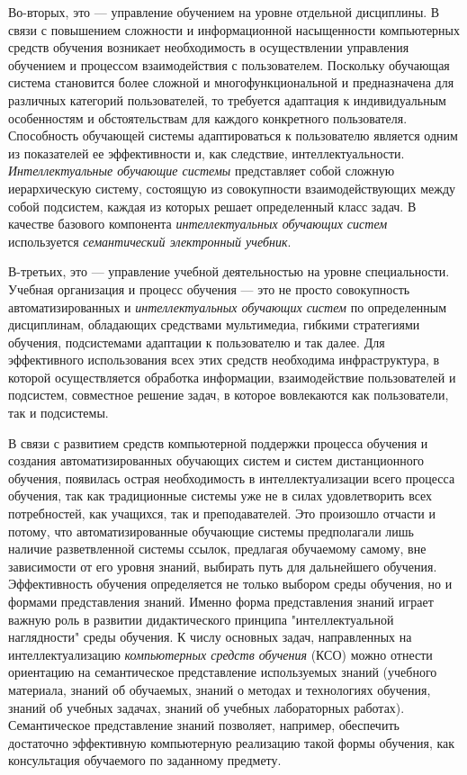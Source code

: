 Во-вторых, это --- управление обучением на уровне отдельной дисциплины. В связи с повышением сложности и информационной насыщенности компьютерных средств обучения возникает необходимость в осуществлении управления обучением и процессом взаимодействия с пользователем. Поскольку обучающая система становится более сложной и многофункциональной и предназначена для различных категорий пользователей, то требуется адаптация к индивидуальным особенностям и обстоятельствам для каждого конкретного пользователя. Способность обучающей системы адаптироваться к пользователю является одним из показателей ее эффективности и, как следствие, интеллектуальности. \textit{Интеллектуальные обучающие системы} представляет собой сложную иерархическую систему, состоящую из совокупности взаимодействующих между собой подсистем, каждая из которых решает определенный класс задач. В качестве базового компонента \textit{интеллектуальных обучающих систем} используется \textit{семантический электронный учебник}.

В-третьих, это --- управление учебной деятельностью на уровне специальности. Учебная организация и процесс обучения --- это не просто совокупность автоматизированных и \textit{интеллектуальных обучающих систем} по определенным дисциплинам, обладающих средствами мультимедиа, гибкими стратегиями обучения, подсистемами адаптации к пользователю и так далее. Для эффективного использования всех этих средств необходима инфраструктура, в которой осуществляется обработка информации, взаимодействие пользователей и подсистем, совместное решение задач, в которое вовлекаются как пользователи, так и подсистемы.

В связи с развитием средств компьютерной поддержки процесса обучения и создания автоматизированных обучающих систем и систем дистанционного обучения, появилась острая необходимость в интеллектуализации всего процесса обучения, так как традиционные системы уже не в силах удовлетворить всех потребностей, как учащихся, так и преподавателей. Это произошло отчасти и потому, что автоматизированные обучающие системы предполагали лишь наличие разветвленной системы ссылок, предлагая обучаемому самому, вне зависимости от его уровня знаний, выбирать путь для дальнейшего обучения. Эффективность обучения определяется не только выбором среды обучения, но и формами представления знаний. Именно форма представления знаний играет важную роль в развитии дидактического принципа "интеллектуальной наглядности"{} среды обучения. К числу основных задач, направленных на интеллектуализацию \textit{компьютерных средств обучения} (КСО) можно отнести ориентацию на семантическое представление используемых знаний (учебного материала, знаний об обучаемых, знаний о методах и технологиях обучения, знаний об учебных задачах, знаний об учебных лабораторных работах). Семантическое представление знаний позволяет, например, обеспечить достаточно эффективную компьютерную реализацию такой формы обучения, как консультация обучаемого по заданному предмету.

